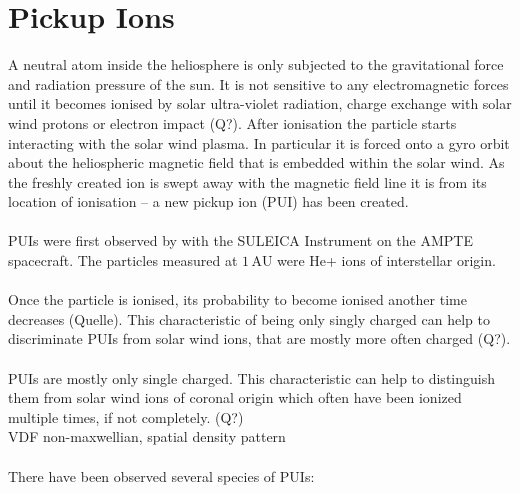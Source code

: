 \section{Pickup Ions}
A neutral atom inside the heliosphere is only subjected to the gravitational force and radiation pressure of the sun. It is not sensitive to any electromagnetic forces until it becomes ionised by solar ultra-violet radiation, charge exchange with solar wind protons or electron impact (Q?). After ionisation the particle starts interacting with the solar wind plasma. In particular it is forced onto a gyro orbit about the heliospheric magnetic field
that is embedded within the solar wind. As the freshly created ion is swept away with the magnetic field line it is  from its location of ionisation -- a new pickup ion (PUI) has been created.
\\ \\
PUIs were first observed by \citet{moebius_nature_85} with the SULEICA Instrument on the AMPTE spacecraft. The particles measured at $1\,\mathrm{AU}$ were He+ ions of interstellar origin.
\\ \\
Once the particle is ionised, its probability to become ionised another time decreases (Quelle). This characteristic of being only singly charged can help to discriminate PUIs from solar wind ions, that are mostly more often charged (Q?).
\\ \\
PUIs are mostly only single charged. This characteristic can help to distinguish them from solar wind ions of coronal origin which often have been ionized multiple times, if not completely. (Q?)
\\
VDF non-maxwellian, spatial density pattern 
\\ \\
There have been observed several species of PUIs: 
